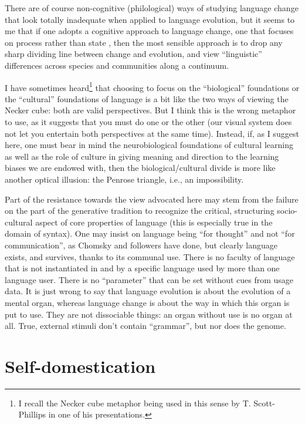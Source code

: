 There are of course non-cognitive (philological) ways of studying language change that look totally inadequate when applied to language evolution, but it seems to me that if one adopts a cognitive approach to language change, one that focuses on process rather than state \citep{heine18}, then the most sensible approach is to drop any sharp dividing line between change and evolution, and view ``linguistic'' differences across species and communities along a continuum.

I have sometimes heard\footnote{I recall the Necker cube metaphor being used in this sense by T. Scott-Phillips in one of his presentations.} that choosing to focus on the ``biological'' foundations or the ``cultural'' foundations of language is a bit like the two ways of viewing the Necker cube: both are valid perspectives. But I think this is the wrong metaphor to use, as it suggests that you must do one or the other (our visual system does not let you entertain both perspectives at the same time). Instead, if, as I suggest here, one must bear in mind the neurobiological foundations of cultural learning as well as the role of culture in giving meaning and direction to the learning biases we are endowed with, then the  biological/cultural divide is more like another optical illusion: the Penrose triangle, i.e., an impossibility.

Part of the resistance towards the view advocated here may stem from the failure on the part of the generative tradition to recognize the critical, structuring socio-cultural aspect of core properties of language (this is especially true in the domain of syntax). One may insist on language being ``for thought'' and not ``for communication'', as Chomsky and followers have done, but clearly language exists, and survives, thanks to its communal use. There is no faculty of language that is not instantiated in and by a specific language used by more than one language user. There is no ``parameter'' that can be set without cues from usage data. It is just wrong to say that language evolution is about the evolution of a mental organ, whereas language change is about the way in which this organ is put to use. They are not dissociable things: an organ without use is no organ at all. True, external stimuli don't contain ``grammar'', but nor does the genome.

\section{Self-domestication}

